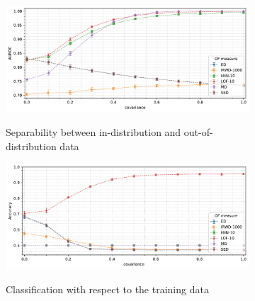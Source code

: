 \begin{figure}[t]
    \centering
    \begin{subfigure}[b]{0.9\textwidth}
        \centering
        \caption{\small Separability between in-distribution and out-of-distribution data}
        \includegraphics[width=\textwidth]{images/correlations/g_corr/trend-correlations-auroc(covariance)-n_correlated_0.20-distance_8-outliers_correlated_False-model_ED,IRWD-1000,kNN-10,LOF-10,MD,SED-aggregated.pdf}
        \label{fig:covariance-auroc}
    \end{subfigure}
    \begin{subfigure}[b]{0.9\textwidth}
        \centering
        \caption{\small Classification with respect to the training data}
        \includegraphics[width=\textwidth]{images/correlations/g_corr/trend-correlations-accuracy_95(covariance)-n_correlated_0.20-distance_8-outliers_correlated_False-model_ED,IRWD-1000,kNN-10,LOF-10,MD,SED-agg.pdf}
        \label{fig:covariance-accuracy}
    \end{subfigure}
    \begin{subfigure}[b]{0.495\textwidth}

\end{subfigure}
\end{figure}
